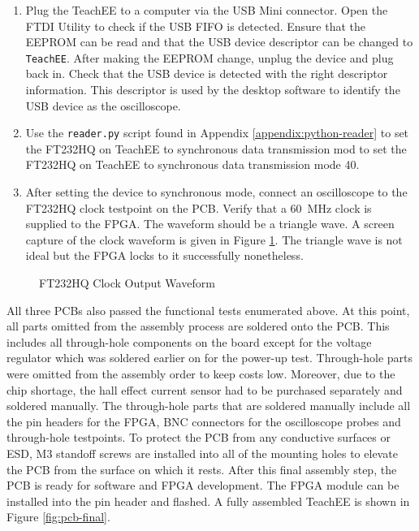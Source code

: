 \documentclass[letterpaper,11pt]{article}
\newcommand{\code}[1]{\texttt{#1}}
\begin{document}
\begin{enumerate}
  \item Plug the TeachEE to a computer via the USB Mini connector. Open the FTDI
    Utility to check if the USB FIFO is detected. Ensure that the EEPROM can be
    read and that the USB device descriptor can be changed to \code{TeachEE}.
    After making the EEPROM change, unplug the device and plug back in. Check
    that the USB device is detected with the right descriptor information. This
    descriptor is used by the desktop software to identify the USB device as the
    oscilloscope.
  \item Use the \code{reader.py} script found in Appendix
    \ref{appendix:python-reader} to set the FT232HQ on TeachEE to synchronous
    data transmission mod to set the FT232HQ on TeachEE to synchronous data
    transmission mode 40.
  \item After setting the device to synchronous mode, connect an oscilloscope to
    the FT232HQ clock testpoint on the PCB. Verify that a \SI{60}{\mega\hertz}
    clock is supplied to the FPGA. The waveform should be a triangle wave. A
    screen capture of the clock waveform is given in Figure \ref{fig:ftdi-clk}.
    The triangle wave is not ideal but the FPGA locks to it successfully
    nonetheless.

\end{enumerate}

\begin{figure}[H]
  \centering
  \caption{FT232HQ Clock Output Waveform}
  \label{fig:ftdi-clk}
\end{figure}

All three PCBs also passed the functional tests enumerated above. At this point,
all parts omitted from the assembly process are soldered onto the PCB. This
includes all through-hole components on the board except for the voltage
regulator which was soldered earlier on for the power-up test. Through-hole
parts were omitted from the assembly order to keep costs low. Moreover, due to
the chip shortage, the hall effect current sensor had to be purchased separately
and soldered manually. The through-hole parts that are soldered manually include
all the pin headers for the FPGA, BNC connectors for the oscilloscope probes and
through-hole testpoints. To protect the PCB from any conductive surfaces or ESD,
M3 standoff screws are installed into all of the mounting holes to elevate the
PCB from the surface on which it rests. After this final assembly step, the PCB
is ready for software and FPGA development. The FPGA module can be installed
into the pin header and flashed. A fully assembled TeachEE is shown in Figure
\ref{fig:pcb-final}.
\end{document}
